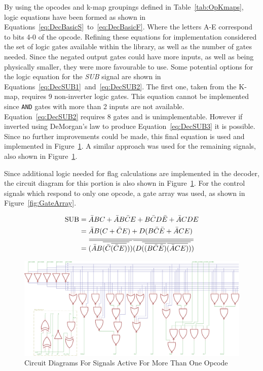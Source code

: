 By using the opcodes and k-map groupings defined in Table~\ref{tab:OpKmaps}, logic equations have been formed as shown in Equations~\eqref{eq:DecBasicS}~to~\eqref{eq:DecBasicF}. 
Where the letters A-E correspond to bits 4-0 of the opcode. 
Refining these equations for implementation considered the set of logic gates available within the library, as well as the number of gates needed. 
Since the negated output gates could have more inputs, as well as being physically smaller, they were more favourable to use. 
Some potential options for the logic equation for the \textit{SUB} signal are shown in Equations~\eqref{eq:DecSUB1}~and~\eqref{eq:DecSUB2}. 
The first one, taken from the K-map, requires 9 non-inverter logic gates. 
This equation cannot be implemented since \texttt{AND} gates with more than 2 inputs are not available. 
Equation~\eqref{eq:DecSUB2} requires 8 gates and is unimplementable. 
However if inverted using DeMorgan's law to produce Equation~\eqref{eq:DecSUB3} it is possible.
Since no further improvements could be made, this final equation is used and implemented in Figure~\ref{fig:DecMultiCirs}. A similar approach was used for the remaining signals, also shown in Figure~\ref{fig:DecMultiCirs}. 

Since additional logic needed for flag calculations are implemented in the decoder, the circuit diagram for this portion is also shown in Figure~\ref{fig:DecMultiCirs}. For the control signals which respond to only one opcode, a gate array was used, as shown in Figure~\ref{fig:GateArray}. 

\newcommand{\overbar}[1]{\mkern 1.5mu\overline{\mkern-1.5mu#1\mkern-1.5mu}\mkern 1.5mu}
\begin{align}
	\text{SUB} &= \bar{A}BC + \bar{A}B\bar{C}E + B\bar{C}D\bar{E} + \bar{A}CDE \label{eq:DecSUB1}\\
	&= \bar{A}B(C + \bar{C}E) + D(B\bar{C}\bar{E} + \bar{A}CE) \label{eq:DecSUB2}\\
	&= \overbar{\overbar{(\bar{A}B\overbar{(\bar{C}\overbar{(\bar{C}E)})})}\overbar{(D\overbar{(\overbar{(B\bar{C}\bar{E})}\overbar{(\bar{A}CE)})})}} \label{eq:DecSUB3}
\end{align}

\begin{figure}[h]
	\centering
	\includegraphics[width=\textwidth]{Figures/ALUDecoderMore1v2.png}
	\caption{Circuit Diagrams For Signals Active For More Than One Opcode}
	\label{fig:DecMultiCirs}
\end{figure}


